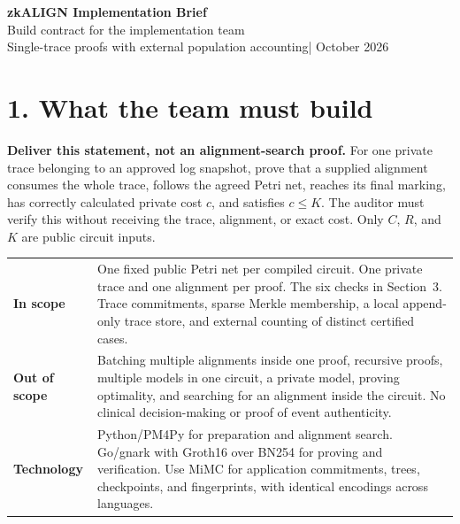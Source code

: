 \documentclass[10pt,a4paper]{article}
\newcommand{\must}[1]{\textbf{#1}}
\begin{document}
\begin{center}
{\LARGE\bfseries zkALIGN Implementation Brief}\\[4pt]
{\large Build contract for the implementation team}\\[3pt]
Single-trace proofs with external population accounting\quad | October 2026
\end{center}

\section*{1. What the team must build}
\must{Deliver this statement, not an alignment-search proof.}
For one private trace belonging to an approved log snapshot, prove that a supplied alignment consumes the whole trace, follows the agreed Petri net, reaches its final marking, has correctly calculated private cost $c$, and satisfies $c\leq K$. The auditor must verify this without receiving the trace, alignment, or exact cost. Only $C$, $R$, and $K$ are public circuit inputs.

\begin{tabularx}{\textwidth}{@{}>{\bfseries}p{}X@{}}
\toprule
In scope & One fixed public Petri net per compiled circuit. One private trace and one alignment per proof. The six checks in Section~3. Trace commitments, sparse Merkle membership, a local append-only trace store, and external counting of distinct certified cases.\\
Out of scope & Batching multiple alignments inside one proof, recursive proofs, multiple models in one circuit, a private model, proving optimality, and searching for an alignment inside the circuit. No clinical decision-making or proof of event authenticity.\\
Technology & Python/PM4Py for preparation and alignment search. Go/gnark with Groth16 over BN254 for proving and verification. Use MiMC for application commitments, trees, checkpoints, and fingerprints, with identical encodings across languages.\\
\bottomrule
\end{tabularx}
\end{document}
